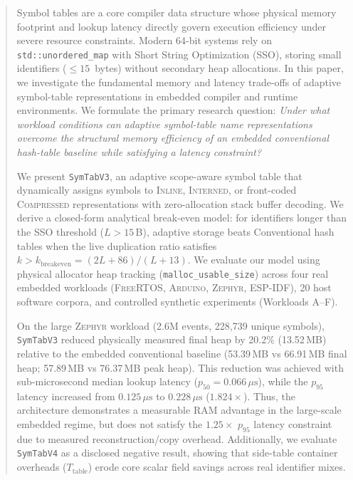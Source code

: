 \documentclass[conference]{IEEEtran}
\begin{document}
\begin{abstract}
Symbol tables are a core compiler data structure whose physical memory footprint and lookup latency directly govern execution efficiency under severe resource constraints. Modern 64-bit systems rely on \texttt{std::unordered\_map} with Short String Optimization (SSO), storing small identifiers ($\le 15$~bytes) without secondary heap allocations. In this paper, we investigate the fundamental memory and latency trade-offs of adaptive symbol-table representations in embedded compiler and runtime environments. We formulate the primary research question: \emph{Under what workload conditions can adaptive symbol-table name representations overcome the structural memory efficiency of an embedded conventional hash-table baseline while satisfying a latency constraint?}

We present \texttt{SymTabV3}, an adaptive scope-aware symbol table that dynamically assigns symbols to \textsc{Inline}, \textsc{Interned}, or front-coded \textsc{Compressed} representations with zero-allocation stack buffer decoding. We derive a closed-form analytical break-even model: for identifiers longer than the SSO threshold ($L > 15$\,B), adaptive storage beats Conventional hash tables when the live duplication ratio satisfies $k > k_{\text{breakeven}} = (2L + 86)/(L + 13)$. We evaluate our model using physical allocator heap tracking (\texttt{malloc\_usable\_size}) across four real embedded workloads (\textsc{FreeRTOS}, \textsc{Arduino}, \textsc{Zephyr}, \textsc{ESP-IDF}), 20 host software corpora, and controlled synthetic experiments (Workloads A--F).

On the large \textsc{Zephyr} workload (2.6M events, 228,739 unique symbols), \texttt{SymTabV3} reduced physically measured final heap by 20.2\% (13.52\,MB) relative to the embedded conventional baseline (53.39\,MB vs 66.91\,MB final heap; 57.89\,MB vs 76.37\,MB peak heap). This reduction was achieved with sub-microsecond median lookup latency ($p_{50} = 0.066\,\mu\text{s}$), while the $p_{95}$ latency increased from $0.125\,\mu\text{s}$ to $0.228\,\mu\text{s}$ ($1.824\times$). Thus, the architecture demonstrates a measurable RAM advantage in the large-scale embedded regime, but does not satisfy the $1.25\times$ $p_{95}$ latency constraint due to measured reconstruction/copy overhead. Additionally, we evaluate \texttt{SymTabV4} as a disclosed negative result, showing that side-table container overheads ($T_{\text{table}}$) erode core scalar field savings across real identifier mixes.
\end{abstract}
\end{document}
